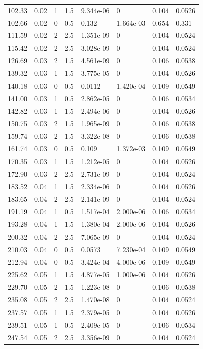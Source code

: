 \documentclass[preview]{standalone}
\begin{document}
{{\begin{tabular}{L{1.2cm}C{1.2cm} C{0.3cm}C{0.5cm} C{1.4cm}C{1.4cm} C{1.4cm}C{1.4cm}}
  102.33  &  0.02  & 1     & 1.5 &  9.344e-06  & 0  & 0.104 &  0.0526   \\ 
  102.66  &  0.02  & 0     & 0.5 &  0.132  & 1.664e-03  & 0.654 &  0.331   \\ 
  111.59  &  0.02  & 2     & 2.5 &  1.351e-09  & 0  & 0.104 &  0.0524   \\ 
  115.42  &  0.02  & 2     & 2.5 &  3.028e-09  & 0  & 0.104 &  0.0524   \\ 
  126.69  &  0.03  & 2     & 1.5 &  4.561e-09  & 0  & 0.106 &  0.0538   \\ 
  139.32  &  0.03  & 1     & 1.5 &  3.775e-05  & 0  & 0.104 &  0.0526   \\ 
  140.18  &  0.03  & 0     & 0.5 &  0.0112  & 1.420e-04  & 0.109 &  0.0549   \\ 
  141.00  &  0.03  & 1     & 0.5 &  2.862e-05  & 0  & 0.106 &  0.0534   \\ 
  142.82  &  0.03  & 1     & 1.5 &  2.494e-06  & 0  & 0.104 &  0.0526   \\ 
  150.75  &  0.03  & 2     & 1.5 &  1.965e-09  & 0  & 0.106 &  0.0538   \\ 
  159.74  &  0.03  & 2     & 1.5 &  3.322e-08  & 0  & 0.106 &  0.0538   \\ 
  161.74  &  0.03  & 0     & 0.5 &  0.109  & 1.372e-03  & 0.109 &  0.0549   \\ 
  170.35  &  0.03  & 1     & 1.5 &  1.212e-05  & 0  & 0.104 &  0.0526   \\ 
  172.90  &  0.03  & 2     & 2.5 &  2.731e-09  & 0  & 0.104 &  0.0524   \\ 
  183.52  &  0.04  & 1     & 1.5 &  2.334e-06  & 0  & 0.104 &  0.0526   \\ 
  183.65  &  0.04  & 2     & 2.5 &  2.141e-09  & 0  & 0.104 &  0.0524   \\ 
  191.19  &  0.04  & 1     & 0.5 &  1.517e-04  & 2.000e-06  & 0.106 &  0.0534   \\ 
  193.28  &  0.04  & 1     & 1.5 &  1.380e-04  & 2.000e-06  & 0.104 &  0.0526   \\ 
  200.32  &  0.04  & 2     & 2.5 &  7.065e-09  & 0  & 0.104 &  0.0524   \\ 
  210.03  &  0.04  & 0     & 0.5 &  0.0573  & 7.230e-04  & 0.109 &  0.0549   \\ 
  212.94  &  0.04  & 0     & 0.5 &  3.424e-04  & 4.000e-06  & 0.109 &  0.0549   \\ 
  225.62  &  0.05  & 1     & 1.5 &  4.877e-05  & 1.000e-06  & 0.104 &  0.0526   \\ 
  229.70  &  0.05  & 2     & 1.5 &  1.223e-08  & 0  & 0.106 &  0.0538   \\ 
  235.08  &  0.05  & 2     & 2.5 &  1.470e-08  & 0  & 0.104 &  0.0524   \\ 
  237.57  &  0.05  & 1     & 1.5 &  2.379e-05  & 0  & 0.104 &  0.0526   \\ 
  239.51  &  0.05  & 1     & 0.5 &  2.409e-05  & 0  & 0.106 &  0.0534   \\ 
  247.54  &  0.05  & 2     & 2.5 &  3.356e-09  & 0  & 0.104 &  0.0524   \\ 
\hline 
\end{tabular} 

}}
\end{document}
